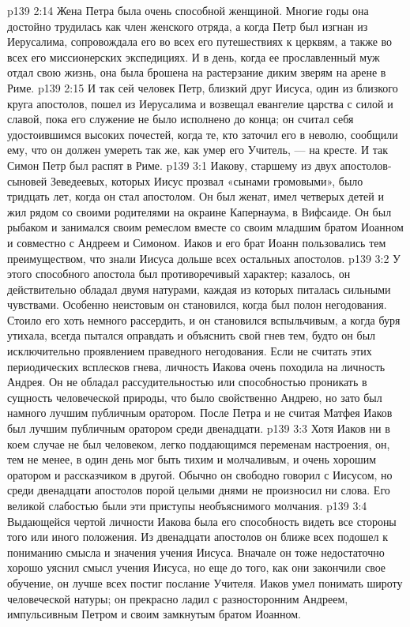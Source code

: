 \vs p139 2:14 \pc Жена Петра была очень способной женщиной. Многие годы она достойно трудилась как член женского отряда, а когда Петр был изгнан из Иерусалима, сопровождала его во всех его путешествиях к церквям, а также во всех его миссионерских экспедициях. И в день, когда ее прославленный муж отдал свою жизнь, она была брошена на растерзание диким зверям на арене в Риме.
\vs p139 2:15 \pc И так сей человек Петр, близкий друг Иисуса, один из близкого круга апостолов, пошел из Иерусалима и возвещал евангелие царства с силой и славой, пока его служение не было исполнено до конца; он считал себя удостоившимся высоких почестей, когда те, кто заточил его в неволю, сообщили ему, что он должен умереть так же, как умер его Учитель, --- на кресте. И так Симон Петр был распят в Риме.
\vs p139 3:1 Иакову, старшему из двух апостолов\hyp{}сыновей Зеведеевых, которых Иисус прозвал «сынами громовыми», было тридцать лет, когда он стал апостолом. Он был женат, имел четверых детей и жил рядом со своими родителями на окраине Капернаума, в Вифсаиде. Он был рыбаком и занимался своим ремеслом вместе со своим младшим братом Иоанном и совместно с Андреем и Симоном. Иаков и его брат Иоанн пользовались тем преимуществом, что знали Иисуса дольше всех остальных апостолов.
\vs p139 3:2 \pc У этого способного апостола был противоречивый характер; казалось, он действительно обладал двумя натурами, каждая из которых питалась сильными чувствами. Особенно неистовым он становился, когда был полон негодования. Стоило его хоть немного рассердить, и он становился вспыльчивым, а когда буря утихала, всегда пытался оправдать и объяснить свой гнев тем, будто он был исключительно проявлением праведного негодования. Если не считать этих периодических всплесков гнева, личность Иакова очень походила на личность Андрея. Он не обладал рассудительностью или способностью проникать в сущность человеческой природы, что было свойственно Андрею, но зато был намного лучшим публичным оратором. После Петра и не считая Матфея Иаков был лучшим публичным оратором среди двенадцати.
\vs p139 3:3 Хотя Иаков ни в коем случае не был человеком, легко поддающимся переменам настроения, он, тем не менее, в один день мог быть тихим и молчаливым, и очень хорошим оратором и рассказчиком в другой. Обычно он свободно говорил с Иисусом, но среди двенадцати апостолов порой целыми днями не произносил ни слова. Его великой слабостью были эти приступы необъяснимого молчания.
\vs p139 3:4 Выдающейся чертой личности Иакова была его способность видеть все стороны того или иного положения. Из двенадцати апостолов он ближе всех подошел к пониманию смысла и значения учения Иисуса. Вначале он тоже недостаточно хорошо уяснил смысл учения Иисуса, но еще до того, как они закончили свое обучение, он лучше всех постиг послание Учителя. Иаков умел понимать широту человеческой натуры; он прекрасно ладил с разносторонним Андреем, импульсивным Петром и своим замкнутым братом Иоанном.
